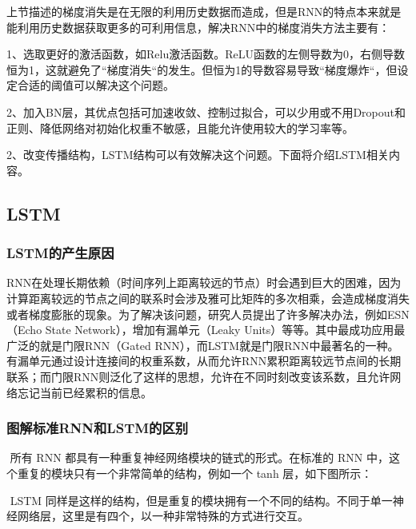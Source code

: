 ​
上节描述的梯度消失是在无限的利用历史数据而造成，但是RNN的特点本来就是能利用历史数据获取更多的可利用信息，解决RNN中的梯度消失方法主要有：

​
1、选取更好的激活函数，如Relu激活函数。ReLU函数的左侧导数为0，右侧导数恒为1，这就避免了``梯度消失``的发生。但恒为1的导数容易导致``梯度爆炸``，但设定合适的阈值可以解决这个问题。

​
2、加入BN层，其优点包括可加速收敛、控制过拟合，可以少用或不用Dropout和正则、降低网络对初始化权重不敏感，且能允许使用较大的学习率等。

​
2、改变传播结构，LSTM结构可以有效解决这个问题。下面将介绍LSTM相关内容。

\subsection{ LSTM}\label{lstm}

\subsubsection{LSTM的产生原因}\label{lstmux7684ux4ea7ux751fux539fux56e0}

​
RNN在处理长期依赖（时间序列上距离较远的节点）时会遇到巨大的困难，因为计算距离较远的节点之间的联系时会涉及雅可比矩阵的多次相乘，会造成梯度消失或者梯度膨胀的现象。为了解决该问题，研究人员提出了许多解决办法，例如ESN（Echo
State Network），增加有漏单元（Leaky
Units）等等。其中最成功应用最广泛的就是门限RNN（Gated
RNN），而LSTM就是门限RNN中最著名的一种。有漏单元通过设计连接间的权重系数，从而允许RNN累积距离较远节点间的长期联系；而门限RNN则泛化了这样的思想，允许在不同时刻改变该系数，且允许网络忘记当前已经累积的信息。

\subsubsection{图解标准RNN和LSTM的区别}\label{ux56feux89e3ux6807ux51c6rnnux548clstmux7684ux533aux522b}

​ 所有 RNN 都具有一种重复神经网络模块的链式的形式。在标准的 RNN
中，这个重复的模块只有一个非常简单的结构，例如一个 tanh 层，如下图所示：


​ LSTM
同样是这样的结构，但是重复的模块拥有一个不同的结构。不同于单一神经网络层，这里是有四个，以一种非常特殊的方式进行交互。

